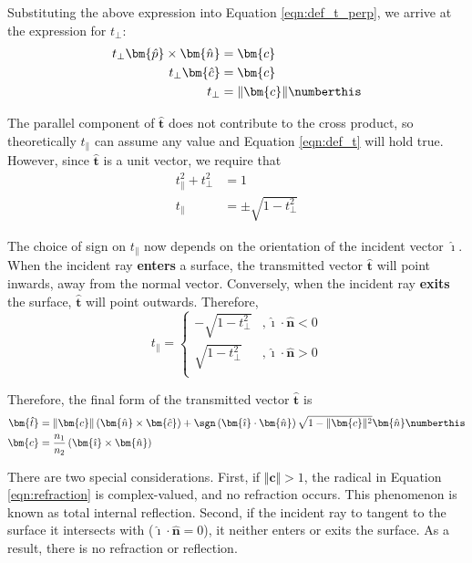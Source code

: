 Substituting the above expression into Equation \ref{eqn:def_t_perp}, we arrive at the expression for $t_{\perp}$:
\begin{align*}
    t_{\perp} \bm{\hat{p}} \times \bm{\hat{n}} &= \bm{c} \\
    t_{\perp} \bm{\hat{c}} &= \bm{c} \\
    t_{\perp} &= \Vert \bm{c} \Vert \numberthis
\end{align*}

The parallel component of $\bm{\hat{t}}$ does not contribute to the cross product, so theoretically $t_{\|}$ can assume any value and Equation \ref{eqn:def_t} will hold true. However, since $\bm{\hat{t}}$ is a unit vector, we
require that
\begin{align*}
    t_{\|}^2 + t_{\perp}^2 &= 1 \\
    t_{\|} &= \pm \sqrt{1 - t_{\perp}^2}
\end{align*}

The choice of sign on $t_{\|}$ now depends on the orientation of the incident vector $\bm{\hat{\imath}}$. When the incident ray \textbf{enters} a surface, the transmitted vector $\bm{\hat{t}}$
will point inwards, away from the normal vector. Conversely, when the incident ray \textbf{exits} the surface, $\bm{\hat{t}}$ will point outwards. Therefore,
$$
    t_{\|} =
    \begin{cases}
        -\sqrt{1 - t_{\perp}^2} &, \bm{\hat{\imath}} \cdot \bm{\hat{n}} < 0 \\
        \sqrt{1 - t_{\perp}^2} &, \bm{\hat{\imath}} \cdot \bm{\hat{n}} > 0 \\
    \end{cases}
$$

Therefore, the final form of the transmitted vector $\bm{\hat{t}}$ is
\begin{align*}
    \bm{\hat{t}} &= \Vert \bm{c} \Vert \left( \bm{\hat{n}} \times \bm{\hat{c}} \right) + \sgn\left( \bm{\hat{\imath}} \cdot \bm{\hat{n}} \right) \sqrt{1 - \Vert \bm{c} \Vert^2} \bm{\hat{n}} \label{eqn:refraction} \numberthis \\
    \bm{c} &= \frac{n_1}{n_2} \left( \bm{\hat{\imath}} \times \bm{\hat{n}} \right)
\end{align*}

There are two special considerations. First, if $\Vert \bm{c} \Vert > 1$, the radical in Equation \ref{eqn:refraction} is complex-valued, and no refraction occurs. This phenomenon is
known as total internal reflection. Second, if the incident ray to tangent to the surface it intersects with ($\bm{\hat{\imath}} \cdot \bm{\hat{n}} = 0$), it neither enters or exits
the surface. As a result, there is no refraction or reflection.